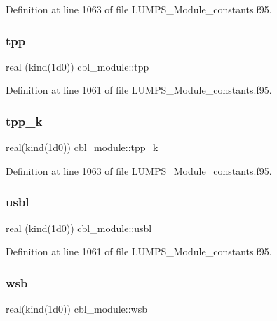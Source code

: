 Definition at line 1063 of file L\+U\+M\+P\+S\+\_\+\+Module\+\_\+constants.\+f95.

\mbox{\label{namespacecbl__module_a32c6cd32a6011ce9ce3536df1935b6ba}} 
\subsubsection{\texorpdfstring{tpp}{tpp}}
{\footnotesize\ttfamily real (kind(1d0)) cbl\+\_\+module\+::tpp}



Definition at line 1061 of file L\+U\+M\+P\+S\+\_\+\+Module\+\_\+constants.\+f95.

\mbox{\label{namespacecbl__module_a63c8fb6ebf38a621ec616ddb04445f03}} 
\subsubsection{\texorpdfstring{tpp\+\_\+k}{tpp\_k}}
{\footnotesize\ttfamily real(kind(1d0)) cbl\+\_\+module\+::tpp\+\_\+k}



Definition at line 1063 of file L\+U\+M\+P\+S\+\_\+\+Module\+\_\+constants.\+f95.

\mbox{\label{namespacecbl__module_ac165fc78c97d6f5f81b06c8282165aa0}} 
\subsubsection{\texorpdfstring{usbl}{usbl}}
{\footnotesize\ttfamily real (kind(1d0)) cbl\+\_\+module\+::usbl}



Definition at line 1061 of file L\+U\+M\+P\+S\+\_\+\+Module\+\_\+constants.\+f95.

\mbox{\label{namespacecbl__module_acdfa6106091fdfa93a6cab25af3d0f1a}} 
\subsubsection{\texorpdfstring{wsb}{wsb}}
{\footnotesize\ttfamily real(kind(1d0)) cbl\+\_\+module\+::wsb}



